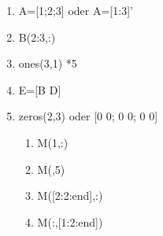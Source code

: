\begin{enumerate}
	\item A=[1;2;3] oder A=[1:3]'
	\item B(2:3,:)
	\item ones(3,1) *5
	\item E=[B D]
	\item zeros(2,3) oder [0 0; 0 0; 0 0]
	\begin{enumerate}
		\item M(1,:)
		\item M(,5)
		\item M([2:2:end],:)
		\item M(:,[1:2:end])
	\end{enumerate}

\end{enumerate}
